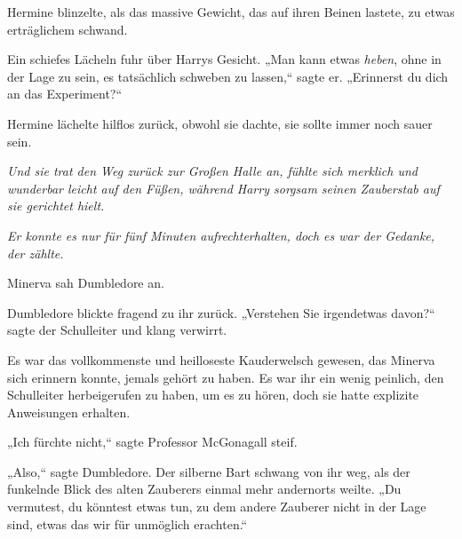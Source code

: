Hermine blinzelte, als das massive Gewicht, das auf ihren Beinen lastete, zu etwas erträglichem schwand.

Ein schiefes Lächeln fuhr über Harrys Gesicht. „Man kann etwas \emph{heben}, ohne in der Lage zu sein, es tatsächlich schweben zu lassen,“ sagte er. „Erinnerst du dich an das Experiment?“

Hermine lächelte hilflos zurück, obwohl sie dachte, sie sollte immer noch sauer sein.

\emph{Und sie trat den Weg zurück zur Großen Halle an, fühlte sich merklich und wunderbar leicht auf den Füßen, während Harry sorgsam seinen Zauberstab auf sie gerichtet hielt.}

\emph{Er konnte es nur für fünf Minuten aufrechterhalten, doch es war der Gedanke, der zählte.}

\later

Minerva sah Dumbledore an.

Dumbledore blickte fragend zu ihr zurück. „Verstehen Sie irgendetwas davon?“ sagte der Schulleiter und klang verwirrt.

Es war das vollkommenste und heilloseste Kauderwelsch gewesen, das Minerva sich erinnern konnte, jemals gehört zu haben. Es war ihr ein wenig peinlich, den Schulleiter herbeigerufen zu haben, um es zu hören, doch sie hatte explizite Anweisungen erhalten.

„Ich fürchte nicht,“ sagte Professor McGonagall steif.

„Also,“ sagte Dumbledore. Der silberne Bart schwang von ihr weg, als der funkelnde Blick des alten Zauberers einmal mehr andernorts weilte. „Du vermutest, du könntest etwas tun, zu dem andere Zauberer nicht in der Lage sind, etwas das wir für unmöglich erachten.“

